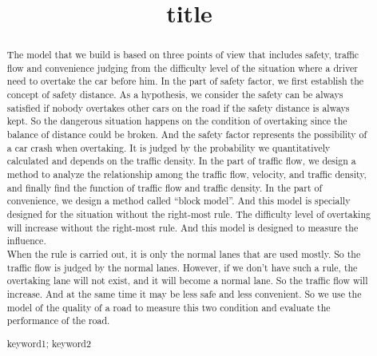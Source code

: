 \documentclass[a4paper, 11pt]{article}
\title{title}
\begin{document}
\begin{abstract}
The model that we build is based on three points of view that includes safety, traffic flow and convenience judging from the difficulty level of the situation where a driver need to overtake the car before him.
In the part of safety factor, we first establish the concept of safety distance. As a hypothesis, we consider the safety can be always satisfied if nobody overtakes other cars on the road if the safety distance is always kept. So the dangerous situation happens on the condition of overtaking since the balance of distance could be broken. And the safety factor represents the possibility of a car crash when overtaking. It is judged by the probability we quantitatively calculated and depends on the traffic density. 
In the part of traffic flow, we design a method to analyze the relationship among the traffic flow, velocity, and traffic density, and finally find the function of traffic flow and traffic density. 
In the part of convenience, we design a method called “block model”. And this model is specially designed for the situation without the right-most rule. The difficulty level of overtaking will increase without the right-most rule. And this model is designed to measure the influence.\\
When the rule is carried out, it is only the normal lanes that are used mostly. So the traffic flow is judged by the normal lanes. However, if we don’t have such a rule, the overtaking lane will not exist, and it will become a normal lane. So the traffic flow will increase. And at the same time it may be less safe and less convenient. So we use the model of the quality of a road to measure this two condition and evaluate the performance of the road. 


\begin{keywords}
keyword1; keyword2
\end{keywords}
\end{abstract}
\maketitle
\pagestyle{empty}
\newpage
\tableofcontents
\newpage
\pagestyle{fancy}

\end{document}
